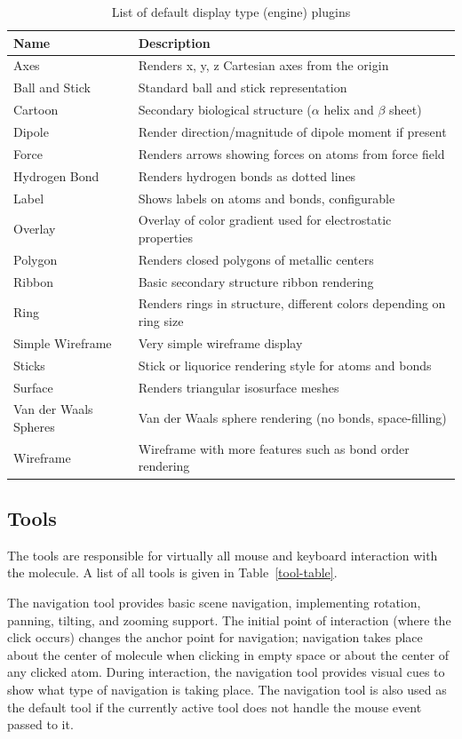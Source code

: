 \documentclass[10pt]{bmc_article}
\newenvironment{bmcformat}{\begin{raggedright}
\baselineskip20pt\sloppy\setboolean{publ}{false}}{\end{raggedright}
\baselineskip20pt\sloppy}
\begin{document}
\begin{bmcformat}
\begin{table}
\caption{List of default display type (engine) plugins}
\begin{tabular}{l | l}
\hline
Name & Description \\
\hline
Axes & Renders x, y, z Cartesian axes from the origin \\
Ball and Stick & Standard ball and stick representation \\
Cartoon & Secondary biological structure ($\alpha$ helix and $\beta$ sheet) \\
Dipole & Render direction/magnitude of dipole moment if present \\
Force & Renders arrows showing forces on atoms from force field \\
Hydrogen Bond & Renders hydrogen bonds as dotted lines \\
Label & Shows labels on atoms and bonds, configurable \\
Overlay & Overlay of color gradient used for electrostatic properties \\
Polygon & Renders closed polygons of metallic centers \\
Ribbon & Basic secondary structure ribbon rendering \\
Ring & Renders rings in structure, different colors depending on ring size \\
Simple Wireframe & Very simple wireframe display \\
Sticks & Stick or liquorice rendering style for atoms and bonds \\
Surface &Renders triangular isosurface meshes \\
Van der Waals Spheres & Van der Waals sphere rendering (no bonds, space-filling) \\
Wireframe & Wireframe with more features such as bond order rendering \\
\hline
\end{tabular}
\end{table}

\subsection{Tools}

The tools are responsible for virtually all mouse and keyboard interaction with
the molecule. A list of all tools is given in Table~\ref{tool-table}.

The navigation tool provides basic scene navigation, implementing rotation,
panning, tilting, and zooming support. The initial point of interaction (where
the click occurs) changes the anchor point for navigation; navigation takes
place about the center of molecule when clicking in empty space or about the
center of any clicked atom. During interaction, the navigation tool provides
visual cues to show what type of navigation is taking place. The navigation
tool is also used as the default tool if the currently active tool does not
handle the mouse event passed to it.


\end{bmcformat}
\end{document}
